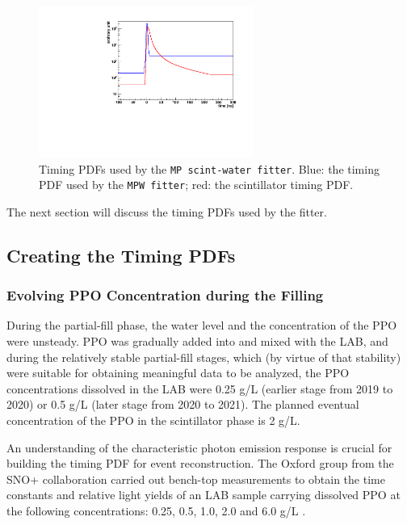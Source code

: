 \begin{figure}[htbp]
	\centering	
	\includegraphics[width=7cm]{scintpdf.pdf}
	\caption[Timing PDFs used by the \texttt{MP scint-water fitter}.]{Timing PDFs used by the \texttt{MP scint-water fitter}. Blue: the timing PDF used by the \texttt{MPW fitter}; red: the scintillator timing PDF.	\label{partialpdf}}
\end{figure}

The next section will discuss the timing PDFs used by the fitter.

\subsection{Creating the Timing PDFs}

\subsubsection{Evolving PPO Concentration during the Filling}\label{sect:differentPPOconcen}

During the partial-fill phase, the water level and the concentration of the PPO were unsteady. PPO was gradually added into and mixed with the LAB, and during the relatively stable partial-fill stages, which (by virtue of that stability) were suitable for obtaining meaningful data to be analyzed, the PPO concentrations dissolved in the LAB were 0.25 g/L (earlier stage from 2019 to 2020) or 0.5 g/L (later stage from 2020 to 2021). The planned eventual concentration of the PPO in the scintillator phase is 2 g/L.

An understanding of the characteristic photon emission response is crucial for building the timing PDF for event reconstruction. The Oxford group from the SNO+ collaboration carried out bench-top measurements to obtain the time constants and relative light yields of an LAB sample carrying dissolved PPO at the following concentrations: 0.25, 0.5, 1.0, 2.0 and 6.0 g/L \cite{oxfordMeasurement0,oxfordMeasurement}.

